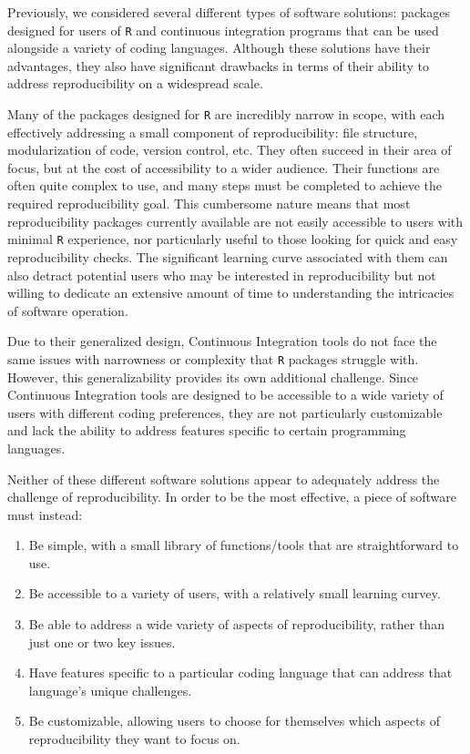 \documentclass[12pt,twoside]{reedthesis}
\providecommand{\tightlist}{%
  \setlength{\itemsep}{0pt}\setlength{\parskip}{0pt}}
\begin{document}
Previously, we considered several different types of software solutions:
packages designed for users of \texttt{R} and continuous integration
programs that can be used alongside a variety of coding languages.
Although these solutions have their advantages, they also have
significant drawbacks in terms of their ability to address
reproducibility on a widespread scale.

Many of the packages designed for \texttt{R} are incredibly narrow in
scope, with each effectively addressing a small component of
reproducibility: file structure, modularization of code, version
control, etc. They often succeed in their area of focus, but at the cost
of accessibility to a wider audience. Their functions are often quite
complex to use, and many steps must be completed to achieve the required
reproducibility goal. This cumbersome nature means that most
reproducibility packages currently available are not easily accessible
to users with minimal \texttt{R} experience, nor particularly useful to
those looking for quick and easy reproducibility checks. The significant
learning curve associated with them can also detract potential users who
may be interested in reproducibility but not willing to dedicate an
extensive amount of time to understanding the intricacies of software
operation.

Due to their generalized design, Continuous Integration tools do not
face the same issues with narrowness or complexity that \texttt{R}
packages struggle with. However, this generalizability provides its own
additional challenge. Since Continuous Integration tools are designed to
be accessible to a wide variety of users with different coding
preferences, they are not particularly customizable and lack the ability
to address features specific to certain programming languages.

Neither of these different software solutions appear to adequately
address the challenge of reproducibility. In order to be the most
effective, a piece of software must instead:
\begin{enumerate}
\def\labelenumi{\arabic{enumi})}
\tightlist
\item
  Be simple, with a small library of functions/tools that are
  straightforward to use.
\item
  Be accessible to a variety of users, with a relatively small learning
  curvey.
\item
  Be able to address a wide variety of aspects of reproducibility,
  rather than just one or two key issues.
\item
  Have features specific to a particular coding language that can
  address that language's unique challenges.
\item
  Be customizable, allowing users to choose for themselves which aspects
  of reproducibility they want to focus on.
\end{enumerate}
\end{document}
